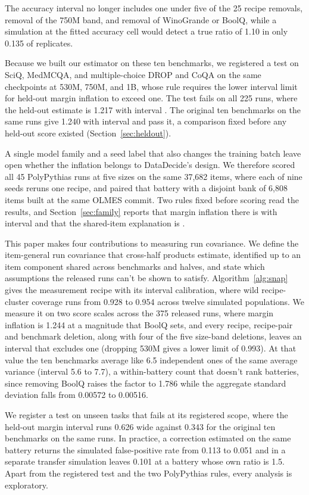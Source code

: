 The accuracy interval no longer includes one under five of the 25 recipe removals, removal of the 750M band, and removal of WinoGrande or BoolQ, while a simulation at the fitted accuracy cell would detect a true ratio of 1.10 in only 0.135 of replicates.

Because we built our estimator on these ten benchmarks, we registered a test on SciQ, MedMCQA, and multiple-choice DROP and CoQA on the same checkpoints at 530M, 750M, and 1B, whose rule requires the lower interval limit for held-out margin inflation to exceed one. The test fails on all 225 runs, where the held-out estimate is 1.217 with interval . The original ten benchmarks on the same runs give 1.240 with interval  and pass it, a comparison fixed before any held-out score existed (Section~\ref{sec:heldout}).

A single model family and a seed label that also changes the training batch leave open whether the inflation belongs to DataDecide's design. We therefore scored all 45 PolyPythias runs at five sizes on the same 37,682 items, where each of nine seeds reruns one recipe, and paired that battery with a disjoint bank of 6,808 items built at the same OLMES commit. Two rules fixed before scoring read the results, and Section~\ref{sec:family} reports that margin inflation there is  with interval  and that the shared-item explanation is .

This paper makes four contributions to measuring run covariance. We define the item-general run covariance that cross-half products estimate, identified up to an item component shared across benchmarks and halves, and state which assumptions the released runs can't be shown to satisfy. Algorithm~\ref{alg:snap} gives the measurement recipe with its interval calibration, where wild recipe-cluster coverage runs from 0.928 to 0.954 across twelve simulated populations. We measure it on two score scales across the 375 released runs, where margin inflation is 1.244 at a magnitude that BoolQ sets, and every recipe, recipe-pair and benchmark deletion, along with four of the five size-band deletions, leaves an interval that excludes one (dropping 530M gives a lower limit of 0.993). At that value the ten benchmarks average like 6.5 independent ones of the same average variance (interval 5.6 to 7.7), a within-battery count that doesn't rank batteries, since removing BoolQ raises the factor to 1.786 while the aggregate standard deviation falls from 0.00572 to 0.00516.

We register a test on unseen tasks that fails at its registered scope, where the held-out margin interval runs 0.626 wide against 0.343 for the original ten benchmarks on the same runs. In practice, a correction estimated on the same battery returns the simulated false-positive rate from 0.113 to 0.051 and in a separate transfer simulation leaves 0.101 at a battery whose own ratio is 1.5. Apart from the registered test and the two PolyPythias rules, every analysis is exploratory.
